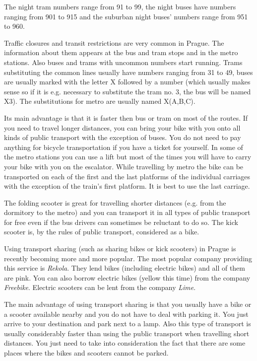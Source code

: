 The night tram numbers range from 91 to 99, the night buses have numbers ranging
from 901 to 915 and the suburban night buses' numbers range from 951 to 960.

Traffic closures and transit restrictions are very common in Prague. The
information about them appears at the bus and tram stops and in the metro
stations. Also buses and trams with uncommon numbers start running.
Trams substituting the common lines usually have numbers ranging from 31 to 49,
buses are usually marked with the letter X followed by a number (which usually
makes sense so if it is e.g. necessary to substitute the tram no. 3, the bus
will be named X3).
The substitutions for metro are usually named X(A,B,C).

Its main advantage is that it is faster then bus or tram on most of the routes.
If you need to travel longer distances, you can bring your bike with you onto
all kinds of public transport with the exception of buses.
You do not need to pay anything for bicycle transportation if you have a ticket
for yourself.
In some of the metro stations you can use a lift but most of the times you will
have to carry your bike with you on the escalator.
While travelling by metro the bike can be transported on each of the first and
the last platforms of the individual carriages with the exception of the train’s
first platform. It is best to use the last carriage.

The folding scooter is great for travelling shorter distances (e.g. from the
dormitory to the metro) and you can transport it in all types of public
transport for free even if the bus drivers can sometimes be reluctant to do so.
The kick scooter is, by the rules of public transport, considered as a bike.

Using transport sharing (such as sharing bikes or kick scooters) in Prague is
recently becoming more and more popular.
The most popular company providing this service is \textit{Rekola}. They lend
bikes (including electric bikes) and all of them are pink. You can also borrow
electric bikes (yellow this time) from the company \textit{Freebike}. Electric
scooters can be lent from the company \textit{Lime}.


The main advantage of using transport sharing is that you usually have a bike or
a scooter available nearby and you do not have to deal with parking it. You just
arrive to your destination and park next to a lamp.
Also this type of transport is usually considerably faster than using the public
transport when travelling short distances.
You just need to take into consideration the fact that there are some places
where the bikes and scooters cannot be parked.


